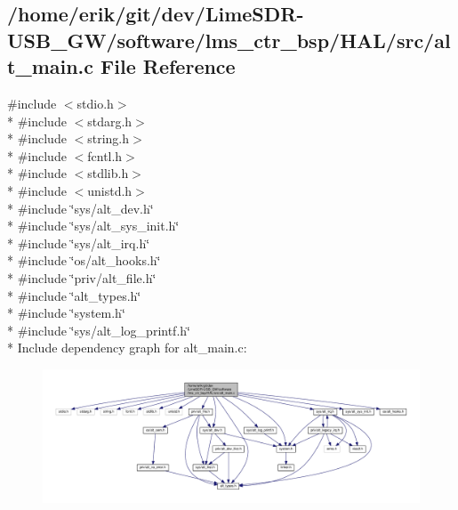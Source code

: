 \subsection{/home/erik/git/dev/\+Lime\+S\+D\+R-\/\+U\+S\+B\+\_\+\+G\+W/software/lms\+\_\+ctr\+\_\+bsp/\+H\+A\+L/src/alt\+\_\+main.c File Reference}
\label{alt__main_8c}
{\ttfamily \#include $<$stdio.\+h$>$}\\*
{\ttfamily \#include $<$stdarg.\+h$>$}\\*
{\ttfamily \#include $<$string.\+h$>$}\\*
{\ttfamily \#include $<$fcntl.\+h$>$}\\*
{\ttfamily \#include $<$stdlib.\+h$>$}\\*
{\ttfamily \#include $<$unistd.\+h$>$}\\*
{\ttfamily \#include \char`\"{}sys/alt\+\_\+dev.\+h\char`\"{}}\\*
{\ttfamily \#include \char`\"{}sys/alt\+\_\+sys\+\_\+init.\+h\char`\"{}}\\*
{\ttfamily \#include \char`\"{}sys/alt\+\_\+irq.\+h\char`\"{}}\\*
{\ttfamily \#include \char`\"{}os/alt\+\_\+hooks.\+h\char`\"{}}\\*
{\ttfamily \#include \char`\"{}priv/alt\+\_\+file.\+h\char`\"{}}\\*
{\ttfamily \#include \char`\"{}alt\+\_\+types.\+h\char`\"{}}\\*
{\ttfamily \#include \char`\"{}system.\+h\char`\"{}}\\*
{\ttfamily \#include \char`\"{}sys/alt\+\_\+log\+\_\+printf.\+h\char`\"{}}\\*
Include dependency graph for alt\+\_\+main.\+c\+:
\nopagebreak
\begin{figure}[H]
\begin{center}
\leavevmode
\includegraphics[width=350pt]{d1/df4/alt__main_8c__incl}
\end{center}
\end{figure}
